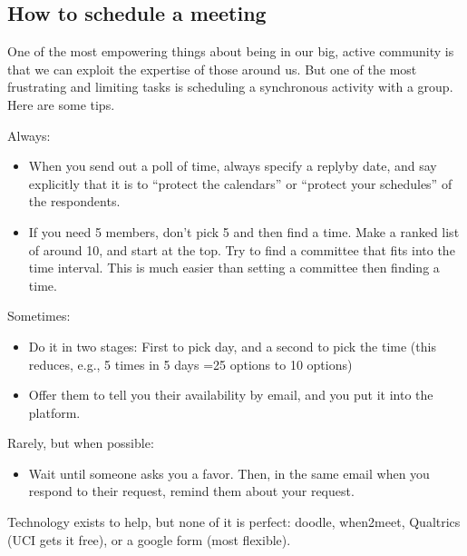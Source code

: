\documentclass[letterpaper,10pt,english]{sphinxmanual}
\begin{document}
\subsection{How to schedule a meeting}
\label{\detokenize{OldEmails:how-to-schedule-a-meeting}}\label{\detokenize{OldEmails:scheduling}}
\sphinxAtStartPar
One of the most empowering things about being in our big, active community is that we can exploit the expertise of those around us.
But one of the most frustrating and limiting tasks is scheduling a synchronous activity with a group.
Here are some tips.

\sphinxAtStartPar
Always:
\begin{itemize}
\item {} 
\sphinxAtStartPar
When you send out a poll of time, always specify a reply\sphinxhyphen{}by date, and say explicitly that it is to “protect the calendars” or “protect your schedules” of the respondents.

\item {} 
\sphinxAtStartPar
If you need 5 members, don’t pick 5 and then find a time. Make a ranked list of around 10, and start at the top. Try to find a committee that fits into the time interval. This is much easier than setting a committee then finding a time.

\end{itemize}

\sphinxAtStartPar
Sometimes:
\begin{itemize}
\item {} 
\sphinxAtStartPar
Do it in two stages: First to pick day, and a second to pick the time (this reduces, e.g., 5 times in 5 days =25 options to 10 options)

\item {} 
\sphinxAtStartPar
Offer them to tell you their availability by e\sphinxhyphen{}mail, and you put it into the platform.

\end{itemize}

\sphinxAtStartPar
Rarely, but when possible:
\begin{itemize}
\item {} 
\sphinxAtStartPar
Wait until someone asks you a favor. Then, in the same e\sphinxhyphen{}mail when you respond to their request, remind them about your request.

\end{itemize}

\sphinxAtStartPar
Technology exists to help, but none of it is perfect: doodle, when2meet, Qualtrics (UCI gets it free), or a google form (most flexible).
\end{document}
